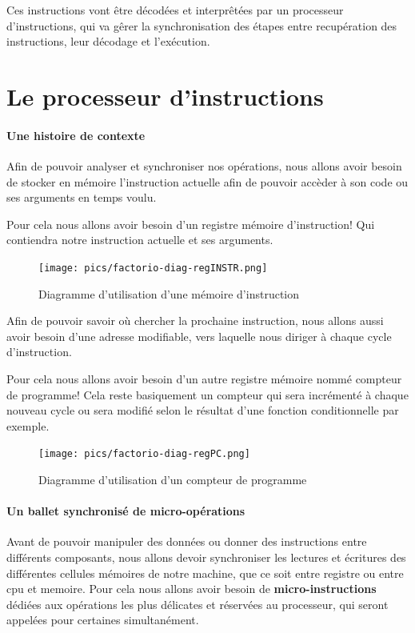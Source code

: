 \documentclass{scrreprt}
\begin{document}
	
	
	Ces instructions vont être décodées et interprêtées par un processeur d'instructions, qui va gêrer la synchronisation des étapes entre recupération des instructions, leur décodage et l'exécution. 
	
	\section{Le processeur d'instructions}
	
	
	
	\paragraph{Une histoire de contexte}
	Afin de pouvoir analyser et synchroniser nos opérations, nous allons avoir besoin de stocker en mémoire l'instruction actuelle afin de pouvoir accèder à son code ou ses arguments en temps voulu.
	
	Pour cela nous allons avoir besoin d'un registre mémoire d'instruction!
	Qui contiendra notre instruction actuelle et ses arguments.
	\begin{figure}[h]
		\centering
		\texttt{[image: pics/factorio-diag-regINSTR.png]}
		
		\caption{Diagramme d'utilisation d'une mémoire d'instruction}
	\end{figure}
	
	Afin de pouvoir savoir où chercher la prochaine instruction, nous allons aussi avoir besoin d'une adresse modifiable, vers laquelle nous diriger à chaque cycle d'instruction.
	
	Pour cela nous allons avoir besoin d'un autre registre mémoire nommé compteur de programme!
	Cela reste basiquement un compteur qui sera incrémenté à chaque nouveau cycle ou sera modifié selon le résultat d'une fonction conditionnelle par exemple.
	
	
	\begin{figure}[h]
		\centering
		\texttt{[image: pics/factorio-diag-regPC.png]}
		
		\caption{Diagramme d'utilisation d'un compteur de programme}
	\end{figure}
	
	\paragraph{Un ballet synchronisé de micro-opérations}
	Avant de pouvoir manipuler des données ou donner des instructions entre différents composants, nous allons devoir synchroniser les lectures et écritures des différentes cellules mémoires de notre machine, que ce soit entre registre ou entre cpu et memoire.
	Pour cela nous allons avoir besoin de \textbf{micro-instructions} dédiées aux opérations les plus délicates et réservées au processeur, qui seront appelées pour certaines simultanément. 
	
\end{document}
